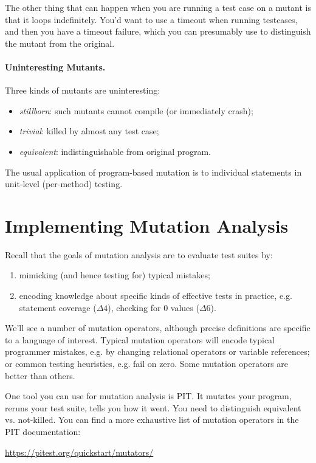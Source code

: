 \documentclass[11pt]{article}
\begin{document}
The other thing that can happen when you are running a test case on a mutant is
that it loops indefinitely. You'd want to use a timeout when running testcases,
and then you have a timeout failure, which you can presumably use to distinguish
the mutant from the original.

\paragraph{Uninteresting Mutants.} Three kinds of mutants are uninteresting:
\begin{itemize}[noitemsep]
\item \emph{stillborn}: such mutants cannot compile (or immediately crash);
\item \emph{trivial}: killed by almost any test case;
\item \emph{equivalent}: indistinguishable from original program.
\end{itemize}

The usual application of program-based mutation is to individual statements
in unit-level (per-method) testing.

\section*{Implementing Mutation Analysis}
Recall that the goals of mutation analysis are to evaluate test suites by:
\begin{enumerate}[noitemsep]
\item mimicking (and hence testing for) typical mistakes;
\item encoding knowledge about specific kinds of effective tests in practice, e.g.
statement coverage ($\Delta 4$), checking for 0 values ($\Delta 6$).
\end{enumerate}

We'll see a number of mutation operators, although precise
definitions are specific to a language of interest. Typical mutation
operators will encode typical programmer mistakes, e.g. by changing
relational operators or variable references; or common testing heuristics, 
e.g. fail on zero. Some mutation operators are better than others.

One tool you can use for mutation analysis is PIT.  It mutates your
program, reruns your test suite, tells you how it went. You need to
distinguish equivalent vs. not-killed.  You can find a more exhaustive
list of mutation operators in the PIT documentation:

\begin{center}
\url{https://pitest.org/quickstart/mutators/}
\end{center}
\end{document}
